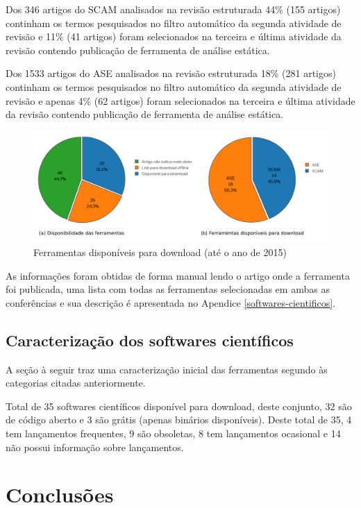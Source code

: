 Dos 346 artigos do SCAM analisados na revisão estruturada 44\% (155 artigos)
continham os termos pesquisados no filtro automático da segunda atividade de
revisão e 11\% (41 artigos) foram selecionados na terceira e última atividade
da revisão contendo publicação de ferramenta de análise estática.

Dos 1533 artigos do ASE analisados na revisão estruturada 18\% (281 artigos)
continham os termos pesquisados no filtro automático da segunda atividade de
revisão e apenas 4\% (62 artigos) foram selecionados na terceira e última
atividade da revisão contendo publicação de ferramenta de análise estática.

\begin{figure}[h]
  \center
  \includegraphics[scale=0.85]{imagens/ferramentas-disponiveis.png}
  \caption{Ferramentas disponíveis para download (até o ano de 2015)}
  \label{ferramentas-disponiveis}
\end{figure}

As informações foram obtidas de forma manual lendo o artigo onde a ferramenta foi publicada,
uma lista com todas as ferramentas selecionadas em ambas as conferências e sua descrição
é apresentada no Apendice \ref{softwares-cientificos}.

\subsection{Caracterização dos softwares científicos}

A seção à seguir traz uma caracterização inicial das ferramentas segundo às
categorias citadas anteriormente.

Total de 35 softwares científicos disponível para download, deste conjunto, 32 são
de código aberto e 3 são grátis (apenas binários disponíveis). Deste total de
35, 4 tem lançamentos frequentes, 9 são obsoletas, 8 tem lançamentos ocasional
e 14 não possui informação sobre lançamentos.

\section{Conclusões}

